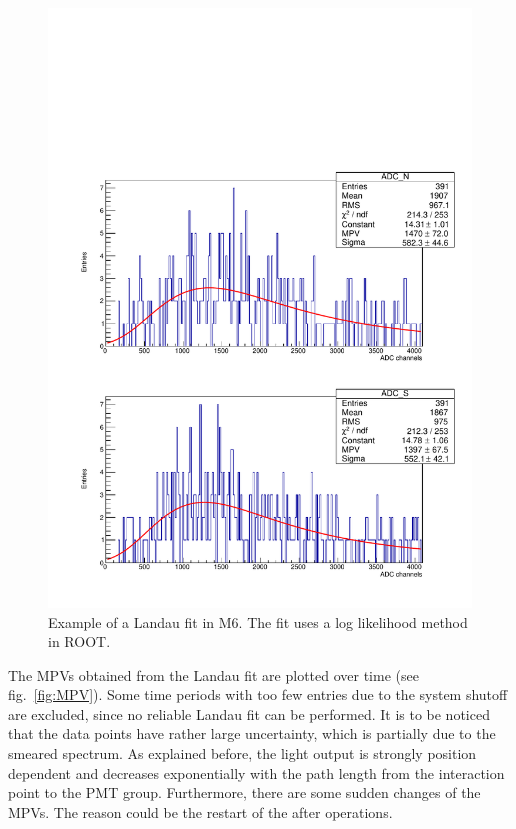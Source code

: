 \begin{figure}[ht]
  \centering
  \includegraphics[width=0.6\textwidth{}]{./fig/LandauFitM6.pdf}
  \caption{Example of a Landau fit in M6. The fit uses a log likelihood method in ROOT.}
  \label{fig:Landau_M6}
\end{figure}

The MPVs obtained from the Landau fit are plotted over time (see fig.\ \ref{fig:MPV}). Some time periods with too few entries due to the system shutoff are excluded, since no reliable Landau fit can be performed. It is to be noticed that the data points have rather large uncertainty, which is partially due to the smeared spectrum. As explained before, the light output is strongly position dependent and decreases exponentially with the path length from the interaction point to the PMT group. Furthermore, there are some sudden changes of the MPVs. The reason could be the restart of the \mvs{} after operations.

